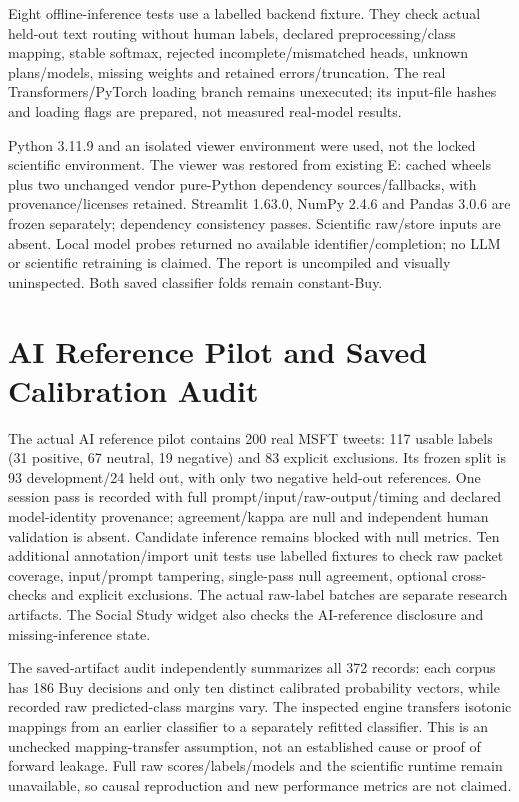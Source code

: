 Eight offline-inference tests use a labelled backend fixture. They check actual held-out text routing without human labels, declared preprocessing/class mapping, stable softmax, rejected incomplete/mismatched heads, unknown plans/models, missing weights and retained errors/truncation. The real Transformers/PyTorch loading branch remains unexecuted; its input-file hashes and loading flags are prepared, not measured real-model results.

Python 3.11.9 and an isolated viewer environment were used, not the locked scientific environment. The viewer was restored from existing E: cached wheels plus two unchanged vendor pure-Python dependency sources/fallbacks, with provenance/licenses retained. Streamlit 1.63.0, NumPy 2.4.6 and Pandas 3.0.6 are frozen separately; dependency consistency passes. Scientific raw/store inputs are absent. Local model probes returned no available identifier/completion; no LLM or scientific retraining is claimed. The report is uncompiled and visually uninspected. Both saved classifier folds remain constant-Buy.

\section{AI Reference Pilot and Saved Calibration Audit}
The actual AI reference pilot contains 200 real MSFT tweets: 117 usable labels (31 positive, 67 neutral, 19 negative) and 83 explicit exclusions. Its frozen split is 93 development/24 held out, with only two negative held-out references. One session pass is recorded with full prompt/input/raw-output/timing and declared model-identity provenance; agreement/kappa are null and independent human validation is absent. Candidate inference remains blocked with null metrics.
Ten additional annotation/import unit tests use labelled fixtures to check raw packet coverage, input/prompt tampering, single-pass null agreement, optional cross-checks and explicit exclusions. The actual raw-label batches are separate research artifacts. The Social Study widget also checks the AI-reference disclosure and missing-inference state.

The saved-artifact audit independently summarizes all 372 records: each corpus has 186 Buy decisions and only ten distinct calibrated probability vectors, while recorded raw predicted-class margins vary. The inspected engine transfers isotonic mappings from an earlier classifier to a separately refitted classifier. This is an unchecked mapping-transfer assumption, not an established cause or proof of forward leakage. Full raw scores/labels/models and the scientific runtime remain unavailable, so causal reproduction and new performance metrics are not claimed.

